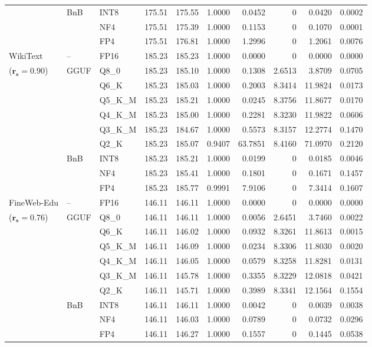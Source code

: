 \begin{longtable}{ll l rrrrrrr}
 & BnB & INT8 & 175.51 & 175.55 & 1.0000 & 0.0452 & \cellcolor{cyan!12} $0$ & 0.0420 & 0.0002 \\
 &  & NF4 & 175.51 & 175.39 & 1.0000 & 0.1153 & \cellcolor{cyan!12} $0$ & 0.1070 & 0.0001 \\
 &  & FP4 & 175.51 & 176.81 & 1.0000 & 1.2996 & \cellcolor{cyan!12} $0$ & 1.2061 & 0.0076 \\
\midrule
WikiText & -- & FP16 & 185.23 & 185.23 & 1.0000 & 0.0000 & \cellcolor{cyan!12} $0$ & 0.0000 & 0.0000 \\
{\small ($\mathbf{r_s{=}0.90}$)} & GGUF & Q8\_0 & 185.23 & 185.10 & 1.0000 & 0.1308 & 2.6513 & 3.8709 & 0.0705 \\
 &  & Q6\_K & 185.23 & 185.03 & 1.0000 & 0.2003 & 8.3414 & 11.9824 & 0.0173 \\
 &  & Q5\_K\_M & 185.23 & 185.21 & 1.0000 & 0.0245 & 8.3756 & 11.8677 & 0.0170 \\
 &  & Q4\_K\_M & 185.23 & 185.00 & 1.0000 & 0.2281 & 8.3230 & 11.9822 & 0.0606 \\
 &  & Q3\_K\_M & 185.23 & 184.67 & 1.0000 & 0.5573 & 8.3157 & 12.2774 & 0.1470 \\
 &  & Q2\_K & 185.23 & 185.07 & \cellcolor{red!18} 0.9407 & \cellcolor{red!18} 63.7851 & 8.4160 & \cellcolor{red!18} 71.0970 & \cellcolor{red!18} 0.2120 \\
 & BnB & INT8 & 185.23 & 185.21 & 1.0000 & 0.0199 & \cellcolor{cyan!12} $0$ & 0.0185 & 0.0046 \\
 &  & NF4 & 185.23 & 185.41 & 1.0000 & 0.1801 & \cellcolor{cyan!12} $0$ & 0.1671 & 0.1457 \\
 &  & FP4 & 185.23 & 185.77 & 0.9991 & 7.9106 & \cellcolor{cyan!12} $0$ & 7.3414 & 0.1607 \\
\midrule
FineWeb-Edu & -- & FP16 & 146.11 & 146.11 & 1.0000 & 0.0000 & \cellcolor{cyan!12} $0$ & 0.0000 & 0.0000 \\
{\small ($\mathbf{r_s{=}0.76}$)} & GGUF & Q8\_0 & 146.11 & 146.11 & 1.0000 & 0.0056 & 2.6451 & 3.7460 & 0.0022 \\
 &  & Q6\_K & 146.11 & 146.02 & 1.0000 & 0.0932 & 8.3261 & 11.8613 & 0.0015 \\
 &  & Q5\_K\_M & 146.11 & 146.09 & 1.0000 & 0.0234 & 8.3306 & 11.8030 & 0.0020 \\
 &  & Q4\_K\_M & 146.11 & 146.05 & 1.0000 & 0.0579 & 8.3258 & 11.8281 & 0.0131 \\
 &  & Q3\_K\_M & 146.11 & 145.78 & 1.0000 & 0.3355 & 8.3229 & 12.0818 & 0.0421 \\
 &  & Q2\_K & 146.11 & 145.71 & 1.0000 & 0.3989 & 8.3341 & 12.1564 & 0.1554 \\
 & BnB & INT8 & 146.11 & 146.11 & 1.0000 & 0.0042 & \cellcolor{cyan!12} $0$ & 0.0039 & 0.0038 \\
 &  & NF4 & 146.11 & 146.03 & 1.0000 & 0.0789 & \cellcolor{cyan!12} $0$ & 0.0732 & 0.0296 \\
 &  & FP4 & 146.11 & 146.27 & 1.0000 & 0.1557 & \cellcolor{cyan!12} $0$ & 0.1445 & 0.0538 \\
\end{longtable}
\endgroup